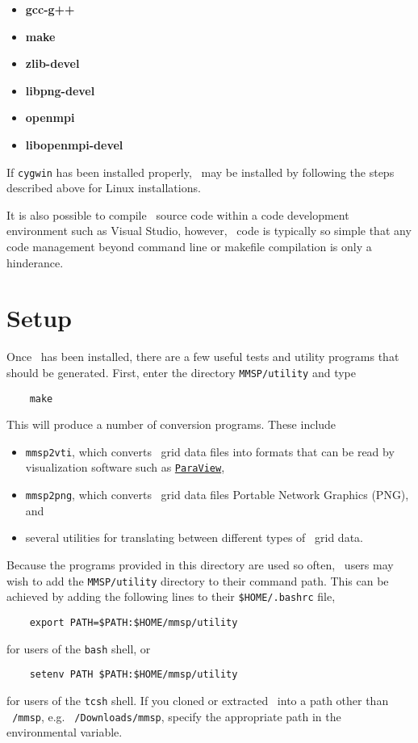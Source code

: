 \begin{itemize}
  \item \textbf{gcc-g++}
  \item \textbf{make}
  \item \textbf{zlib-devel}
  \item \textbf{libpng-devel}
  \item \textbf{openmpi}
  \item \textbf{libopenmpi-devel}
\end{itemize}

If {\tt cygwin} has been installed properly, \MMSP\ may be installed by following the steps described above for Linux installations.

It is also possible to compile \MMSP\ source code within a code development environment such as Visual Studio, however, \MMSP\ code is typically so simple that any code management beyond command line or makefile compilation is only a hinderance.

\section{Setup}
Once \MMSP\ has been installed, there are a few useful tests and utility programs that should be generated.  First, enter the directory {\tt MMSP/utility} and type
\begin{shadebox}
\begin{verbatim}
    make
\end{verbatim}
\end{shadebox}
This will produce a number of conversion programs.  These include
\begin{itemize}
  \item {\tt mmsp2vti}, which converts \MMSP\ grid data files into formats that can be read by visualization software such as \href{http://www.paraview.org}{\tt ParaView},
  \item {\tt mmsp2png}, which converts \MMSP\ grid data files Portable Network Graphics (PNG), and
  \item several utilities for translating between different types of \MMSP\ grid data.
\end{itemize}
Because the programs provided in this directory are used so often, \MMSP\ users may wish to add the {\tt MMSP/utility} directory to their command path.  This can be achieved by adding the following lines to their {\tt \$HOME/.bashrc} file,
\begin{shadebox}
\begin{verbatim}
    export PATH=$PATH:$HOME/mmsp/utility
\end{verbatim}
\end{shadebox}
for users of the {\tt bash} shell, or
\begin{shadebox}
\begin{verbatim}
    setenv PATH $PATH:$HOME/mmsp/utility
\end{verbatim}
\end{shadebox}
for users of the {\tt tcsh} shell.  If you cloned or extracted \MMSP\ into a path other than {\tt ~/mmsp}, e.g. {\tt ~/Downloads/mmsp}, specify the appropriate path in the environmental variable.


